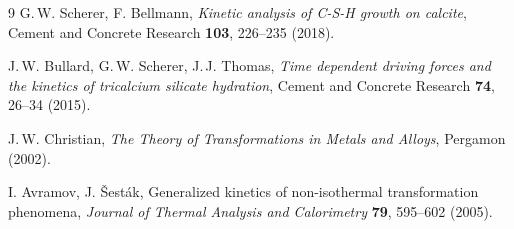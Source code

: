 \documentclass[11pt]{article}
\begin{document}
\begin{thebibliography}{9}
G.\,W. Scherer, F. Bellmann,
\emph{Kinetic analysis of C-S-H growth on calcite},
Cement and Concrete Research \textbf{103}, 226--235 (2018).

J.\,W. Bullard, G.\,W. Scherer, J.\,J. Thomas,
\emph{Time dependent driving forces and the kinetics of tricalcium
silicate hydration},
Cement and Concrete Research \textbf{74}, 26--34 (2015).

J.\,W. Christian,
\emph{The Theory of Transformations in Metals and Alloys},
Pergamon (2002).

I. Avramov, J. \v{S}est\'{a}k,
Generalized kinetics of non-isothermal transformation phenomena,
\emph{Journal of Thermal Analysis and Calorimetry} \textbf{79},
595--602 (2005).
\end{thebibliography}
\end{document}

